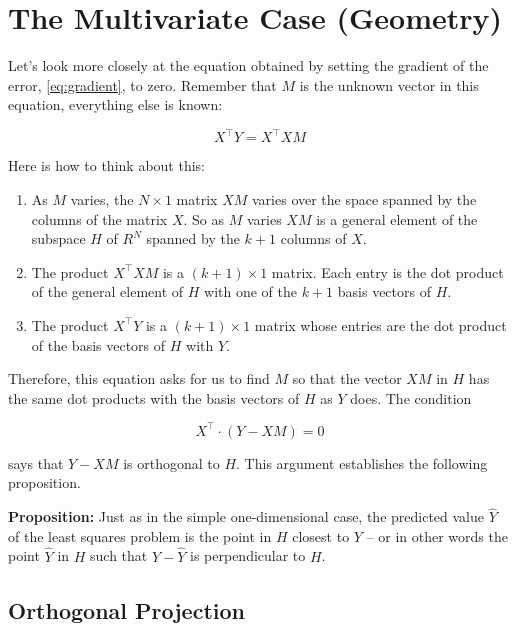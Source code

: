 \documentclass[
  oneside]{scrbook}
\begin{document}
\hypertarget{the-multivariate-case-geometry}{%
\section{The Multivariate Case
(Geometry)}\label{the-multivariate-case-geometry}}

Let's look more closely at the equation obtained by setting the gradient
of the error, \cref{eq:gradient}, to zero. Remember that \(M\) is the
unknown vector in this equation, everything else is known:

\[ X^{\intercal}Y = X^{\intercal}XM \]

Here is how to think about this:

\begin{enumerate}
\def\labelenumi{\arabic{enumi}.}
\item
  As \(M\) varies, the \(N\times 1\) matrix \(XM\) varies over the space
  spanned by the columns of the matrix \(X\). So as \(M\) varies \(XM\)
  is a general element of the subspace \(H\) of \(R^{N}\) spanned by the
  \(k+1\) columns of \(X\).
\item
  The product \(X^{\intercal}XM\) is a \((k+1)\times 1\) matrix. Each
  entry is the dot product of the general element of \(H\) with one of
  the \(k+1\) basis vectors of \(H\).
\item
  The product \(X^{\intercal}Y\) is a \((k+1)\times 1\) matrix whose
  entries are the dot product of the basis vectors of \(H\) with \(Y\).
\end{enumerate}

Therefore, this equation asks for us to find \(M\) so that the vector
\(XM\) in \(H\) has the same dot products with the basis vectors of
\(H\) as \(Y\) does. The condition

\[ X^{\intercal}\cdot (Y-XM)=0 \]

says that \(Y-XM\) is orthogonal to \(H\). This argument establishes the
following proposition.

\textbf{Proposition:} Just as in the simple one-dimensional case, the
predicted value \(\hat{Y}\) of the least squares problem is the point in
\(H\) closest to \(Y\) -- or in other words the point \(\hat{Y}\) in
\(H\) such that \(Y-\hat{Y}\) is perpendicular to \(H\).

\hypertarget{orthogonal-projection}{%
\subsection{Orthogonal Projection}\label{orthogonal-projection}}
\end{document}
